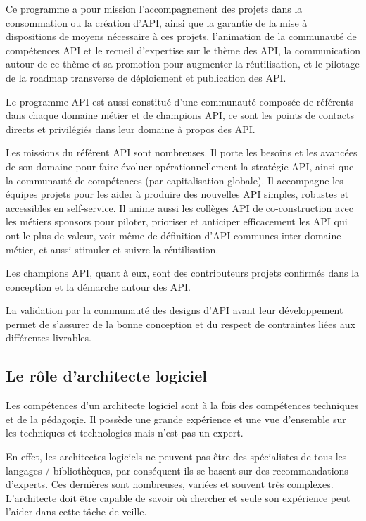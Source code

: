     Ce programme a pour mission l’accompagnement des projets dans la consommation ou la création d’API, ainsi que la garantie de la mise à dispositions de moyens nécessaire à ces projets, l’animation de la communauté de compétences API et le recueil d’expertise sur le thème des API, la communication autour de ce thème et sa promotion pour augmenter la réutilisation, et le pilotage de la roadmap transverse de déploiement et publication des API.

    Le programme API est aussi constitué d’une communauté composée de référents dans chaque domaine métier et de champions API, ce sont les points de contacts directs et privilégiés dans leur domaine à propos des API.

    Les missions du référent API sont nombreuses. Il porte les besoins et les avancées de son domaine pour faire évoluer opérationnellement la stratégie API, ainsi que la communauté de compétences (par capitalisation globale).
    Il accompagne les équipes projets pour les aider à produire des nouvelles API simples, robustes et accessibles en self-service.
    Il anime aussi les collèges API de co-construction avec les métiers sponsors pour piloter, prioriser et anticiper efficacement les API qui ont le plus de valeur, voir même de définition d’API communes inter-domaine métier, et aussi stimuler et suivre la réutilisation.

    Les champions API, quant à eux, sont des contributeurs projets confirmés dans la conception et la démarche autour des API.

    La validation par la communauté des designs d’API avant leur développement permet de s’assurer de la bonne conception et du respect de contraintes liées aux différentes livrables.

    \subsection{Le rôle d'architecte logiciel}

    Les compétences d’un architecte logiciel sont à la fois des compétences techniques et de la pédagogie.
    Il possède une grande expérience et une vue d’ensemble sur les techniques et technologies mais n’est pas un expert.

    En effet, les architectes logiciels ne peuvent pas être des spécialistes de tous les langages / bibliothèques, par conséquent ils se basent sur des recommandations d’experts.
    Ces dernières sont nombreuses, variées et souvent très complexes.
    L’architecte doit être capable de savoir où chercher et seule son expérience peut l’aider dans cette tâche de veille.

